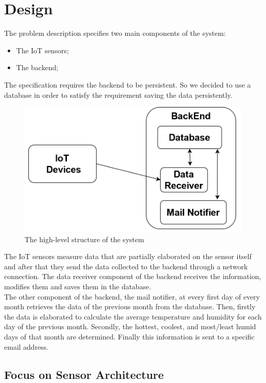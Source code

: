 \documentclass[11pt]{article}
\begin{document}


\section{Design}
The problem description specifies two main components of the system:
\begin{itemize}
    \item The IoT sensors;
    \item The backend;
\end{itemize}

The specification requires the backend to be persistent. So we decided to use a database in order to satisfy the requirement saving the data persistently.

\begin{figure}
    \includegraphics[width=0.8\linewidth]{resources/Design.png} 
    \caption{The high-level structure of the system}
\end{figure}

The IoT sensors measure data that are partially elaborated on the sensor itself and after that they send the data collected to the backend through a network connection. The data receiver component of the backend receives the information, modifies them and saves them in the database. \\
The other component of the backend, the mail notifier, at every first day of every month retrieves the data of the previous month from the database. Then, firstly the data is elaborated to calculate the average temperature and humidity for each day of the previous month. Secondly, the hottest, coolest, and most/least humid days of that month are determined. Finally this information is sent to a specific email address.

\subsection{Focus on Sensor Architecture}
\end{document}
